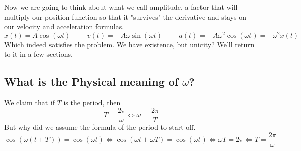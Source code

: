 \documentclass{report}
\begin{document}
      \noindent Now we are going to think about what we call amplitude, a factor that will multiply our position function so that it "survives" the derivative and stays on our velocity and acceleration formulas.
      \begin{equation}
        x(t)=A\cos(\omega t)\hspace{1cm}v(t)=-A\omega\sin(\omega t)\hspace{1cm}a(t)=-A\omega^2\cos(\omega t)=-\omega^2 x(t)
      \end{equation}
      \noindent Which indeed satisfies the problem. We have existence, but unicity? We'll return to it in a few sections.
      \clearpage

      \subsection{What is the Physical meaning of $\omega$?}
        We claim that if $T$ is the period, then
        \begin{equation}
          T=\dfrac{2\pi}{\omega}\Longleftrightarrow\omega=\dfrac{2\pi}{T}
        \end{equation}
        But why did we assume the formula of the period to start off.
        \begin{equation}
          \cos(\omega(t+T))=\cos(\omega t)\Longleftrightarrow\cos(\omega t+\omega T)=\cos(\omega t)\Longleftrightarrow \omega T=2\pi\Longleftrightarrow T=\dfrac{2\pi}{\omega}
        \end{equation}
\end{document}
